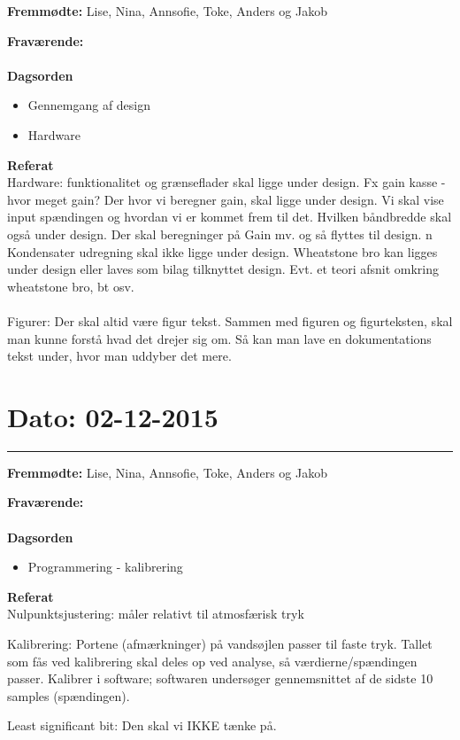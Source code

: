 \textbf{Fremmødte:} Lise, Nina, Annsofie, Toke, Anders og Jakob

\textbf{Fraværende:} 
\\
\\
\textbf{Dagsorden}
\begin{itemize}
	\item Gennemgang af design
	\item Hardware
\end{itemize}

\textbf{Referat}
\\
Hardware: funktionalitet og grænseflader skal ligge under design. Fx gain kasse - hvor meget gain? Der hvor vi beregner gain, skal ligge under design. Vi skal vise input spændingen og hvordan vi er kommet frem til det. Hvilken båndbredde skal også under design. Der skal beregninger på Gain mv. og så flyttes til design. n
Kondensater udregning skal ikke ligge under design.
Wheatstone bro kan ligges under design eller laves som bilag tilknyttet design. 
Evt. et teori afsnit omkring wheatstone bro, bt osv.
\\
\\
Figurer: Der skal altid være figur tekst. Sammen med figuren og figurteksten, skal man kunne forstå hvad det drejer sig om. Så kan man lave en dokumentations tekst under, hvor man uddyber det mere. 



\section{Dato: 02-12-2015}
\hrule

\textbf{Fremmødte:} Lise, Nina, Annsofie, Toke, Anders og Jakob

\textbf{Fraværende:} 
\\
\\
\textbf{Dagsorden}
\begin{itemize}
	\item Programmering - kalibrering
\end{itemize}

\textbf{Referat}
\\
Nulpunktsjustering: måler relativt til atmosfærisk tryk

Kalibrering: Portene (afmærkninger) på vandsøjlen passer til faste tryk. Tallet som fås ved kalibrering skal deles op ved analyse, så værdierne/spændingen passer. 
Kalibrer i software; softwaren undersøger gennemsnittet af de sidste 10 samples (spændingen). 

Least significant bit: Den skal vi IKKE tænke på. 

